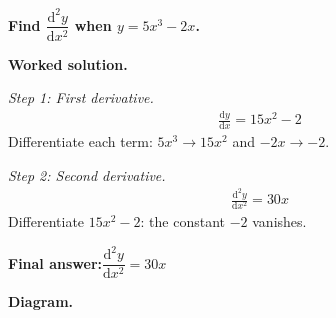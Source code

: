 \documentclass[11pt]{article}
\newcommand{\question}[1]{\par\medskip\noindent\textbf{#1}\par}
\begin{document}
\question{Find \( \dfrac{\mathrm{d}^2y}{\mathrm{d}x^2} \) when \( y = 5x^3 - 2x \).}

\textbf{Worked solution.}

\textit{Step 1: First derivative.}
\[\begin{gathered}
\frac{\mathrm{d}y}{\mathrm{d}x} = 15x^2 - 2
\end{gathered}\]
Differentiate each term: \(5x^3 \to 15x^2\) and \(-2x \to -2\).

\textit{Step 2: Second derivative.}
\[\begin{gathered}
\frac{\mathrm{d}^2y}{\mathrm{d}x^2} = 30x
\end{gathered}\]
Differentiate \(15x^2 - 2\): the constant \(-2\) vanishes.

\begin{answerbox}
\textbf{Final answer:}\quad \(\displaystyle  \dfrac{\mathrm{d}^2y}{\mathrm{d}x^2} = 30x \)
\end{answerbox}
\textbf{Diagram.}
\end{document}

